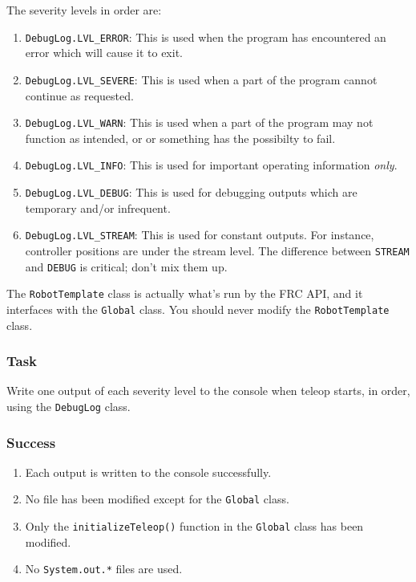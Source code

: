 \documentclass[a4paper]{article}
\begin{document}
The severity levels in order are:

\begin{enumerate}\item{\lstinline{DebugLog.LVL_ERROR}: This is used when the program has encountered an error which will cause it to exit.}\item{\lstinline{DebugLog.LVL_SEVERE}: This is used when a part of the program cannot continue as requested.}\item{\lstinline{DebugLog.LVL_WARN}: This is used when a part of the program may not function as intended, or or something has the possibilty to fail.}\item{\lstinline{DebugLog.LVL_INFO}: This is used for important operating information \textit{only}.}\item{\lstinline{DebugLog.LVL_DEBUG}: This is used for debugging outputs which are temporary and/or infrequent.}\item{\lstinline{DebugLog.LVL_STREAM}: This is used for constant outputs. For instance, controller positions are under the stream level. The difference between \lstinline{STREAM} and \lstinline{DEBUG} is critical; don't mix them up.}\end{enumerate}

The \lstinline{RobotTemplate} class is actually what's run by the FRC API, and it interfaces with the \lstinline{Global} class. You should never modify the \lstinline{RobotTemplate} class.

\subsubsection{Task} Write one output of each severity level to the console when teleop starts, in order, using the \lstinline{DebugLog} class.
\subsubsection{Success} \begin{enumerate}\item{Each output is written to the console successfully.}\item{No file has been modified except for the \lstinline{Global} class.}\item{Only the \lstinline{initializeTeleop()} function in the \lstinline{Global} class has been modified.}\item{No \lstinline{System.out.*} files are used.}\end{enumerate}
\end{document}

